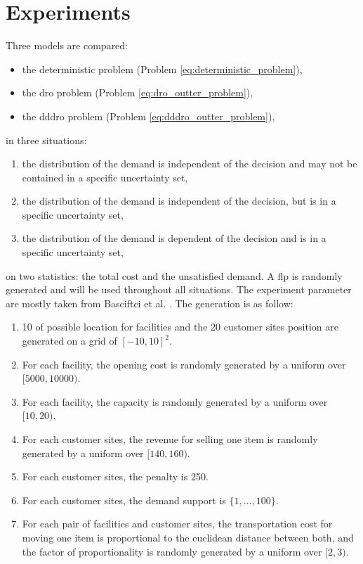 \documentclass[12pt, letterpaper]{article}
\begin{document}
	\section{Experiments}
	Three models are compared:
	\begin{itemize}
		\item the deterministic problem (Problem \eqref{eq:deterministic_problem}),
		\item the \gls{dro} problem (Problem \eqref{eq:dro_outter_problem}),
		\item the \gls{dddro} problem (Problem \eqref{eq:dddro_outter_problem}),
	\end{itemize}
	in three situations:
	\begin{enumerate}
		\item the distribution of the demand is independent of the decision and may not be contained in a specific uncertainty set, \label{sit:ind_rand}
		\item the distribution of the demand is independent of the decision, but is in a specific uncertainty set, \label{sit:ind_unc}
		\item the distribution of the demand is dependent of the decision and is in a specific uncertainty set, \label{sit:dep_unc}
	\end{enumerate}
	on two statistics: the total cost and the unsatisfied demand. A \gls{flp} is randomly generated and will be used throughout all situations. The experiment parameter are mostly taken from Basciftci et al. \cite{basciftci_distributionally_2021}. The generation is as follow:
	\begin{enumerate}
		\item 10 of possible location for facilities and the 20 customer sites position are generated on a grid of $[-10, 10]^2$.
		\item For each facility, the opening cost is randomly generated by a uniform over $[5000, 10000)$.
		\item For each facility, the capacity is randomly generated by a uniform over $[10, 20)$.
		\item For each customer sites, the revenue for selling one item is randomly generated by a uniform over $[140, 160)$.
		\item For each customer sites, the penalty is 250.
		\item For each customer sites, the demand support is $\{1, \dots, 100\}$.
		\item For each pair of facilities and customer sites, the transportation cost for moving one item is proportional to the euclidean distance between both, and the factor of proportionality is randomly generated by a uniform over $[2, 3)$.
	\end{enumerate}
	
\end{document}

